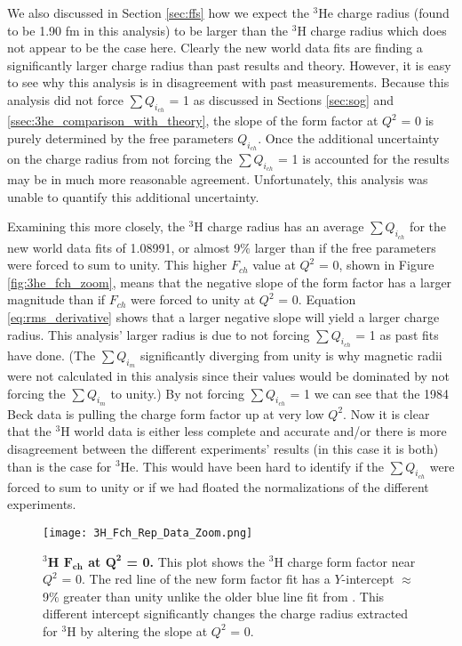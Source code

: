We also discussed in Section \ref{sec:ffs} how we expect the $^3$He charge radius (found to be 1.90 fm in this analysis) to be larger than the $^3$H charge radius which does not appear to be the case here. Clearly the new world data fits are finding a significantly larger charge radius than past results and theory. However, it is easy to see why this analysis is in disagreement with past measurements. Because this analysis did not force $\sum Q_{i_{ch}}$ = 1 as discussed in Sections \ref{sec:sog} and \ref{ssec:3he_comparison_with_theory}, the slope of the form factor at $Q^2$ = 0 is purely determined by the free parameters $Q_{i_{ch}}$. Once the additional uncertainty on the charge radius from not forcing the $\sum Q_{i_{ch}}$ = 1 is accounted for the results may be in much more reasonable agreement. Unfortunately, this analysis was unable to quantify this additional uncertainty.

Examining this more closely, the $^3$H charge radius has an average $\sum Q_{i_{ch}}$ for the new world data fits of 1.08991, or almost 9$\%$ larger than if the free parameters were forced to sum to unity. This higher $F_{ch}$ value at $Q^2$ = 0, shown in Figure \ref{fig:3he_fch_zoom}, means that the negative slope of the form factor has a larger magnitude than if $F_{ch}$ were forced to unity at $Q^2$ = 0. Equation \ref{eq:rms_derivative} shows that a larger negative slope will yield a larger charge radius. This analysis' larger radius is due to not forcing $\sum Q_{i_{ch}}$ = 1 as past fits have done. (The $\sum Q_{i_m}$ significantly diverging from unity is why magnetic radii were not calculated in this analysis since their values would be dominated by not forcing the $\sum Q_{i_{m}}$ to unity.) By not forcing $\sum Q_{i_{ch}}$ = 1 we can see that the 1984 Beck data \cite{Article:Beck84} is pulling the charge form factor up at very low $Q^2$. Now it is clear that the $^3$H world data is either less complete and accurate and/or there is more disagreement between the different experiments' results (in this case it is both) than is the case for $^3$He. This would have been hard to identify if the $\sum Q_{i_{ch}}$ were forced to sum to unity or if we had floated the normalizations of the different experiments.

\begin{figure}[!ht]
	\begin{center}
	\texttt{[image: 3H\_Fch\_Rep\_Data\_Zoom.png]}
	\end{center}
	\caption[$^3$H $F_{ch}$ at $Q^2$ = 0]{
	{\bf{$^3$H $\boldsymbol{F_{ch}}$ at $\boldsymbol{Q^2}$ = 0.}} This plot shows the $^3$H charge form factor near $Q^2$ = 0. The red line of the new form factor fit has a $Y$-intercept $\approx$ 9$\%$ greater than unity unlike the older blue line fit from \cite{Article:Amroun}. This different intercept significantly changes the charge radius extracted for $^3$H by altering the slope at $Q^2$ = 0.}
	\label{fig:3h_fch_zoom}
\end{figure}

